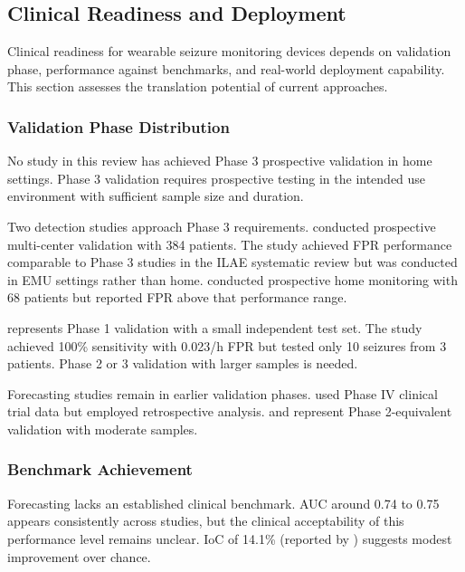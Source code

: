 \subsection{Clinical Readiness and Deployment}
\label{sec:clinical-readiness}

Clinical readiness for wearable seizure monitoring devices depends on validation phase, performance against benchmarks, and real-world deployment capability. This section assesses the translation potential of current approaches.

\subsubsection{Validation Phase Distribution}

No study in this review has achieved Phase 3 prospective validation in home settings. Phase 3 validation requires prospective testing in the intended use environment with sufficient sample size and duration.

Two detection studies approach Phase 3 requirements. \textcite{spahrDeepLearningbasedDetection2025} conducted prospective multi-center validation with 384 patients. The study achieved FPR performance comparable to Phase 3 studies in the ILAE systematic review but was conducted in EMU settings rather than home. \textcite{dongTwoLayerEnsembleMethod2022} conducted prospective home monitoring with 68 patients but reported FPR above that performance range.

\textcite{fineDetectionKeyAutomated2025} represents Phase 1 validation with a small independent test set. The study achieved 100\% sensitivity with 0.023/h FPR but tested only 10 seizures from 3 patients. Phase 2 or 3 validation with larger samples is needed.

Forecasting studies remain in earlier validation phases. \textcite{vielufSeizureMonitoringCombined2025} used Phase IV clinical trial data but employed retrospective analysis. \textcite{meiselMachineLearningWristband2020} and \textcite{nasseriAmbulatorySeizureForecasting2021} represent Phase 2-equivalent validation with moderate samples.

\subsubsection{Benchmark Achievement}

Forecasting lacks an established clinical benchmark. AUC around 0.74 to 0.75 appears consistently across studies, but the clinical acceptability of this performance level remains unclear. IoC of 14.1\% (reported by \textcite{meiselMachineLearningWristband2020}) suggests modest improvement over chance.


